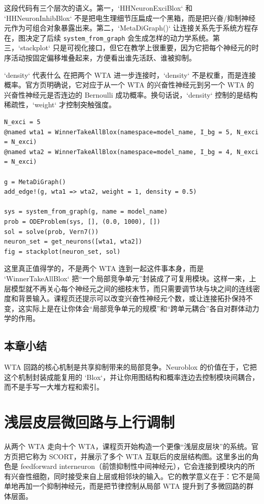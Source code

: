 \documentclass[a4paper]{article}
\begin{document}
这段代码有三个层次的语义。第一，`HHNeuronExciBlox` 和 `HHNeuronInhibBlox` 不是把电生理细节压扁成一个黑箱，而是把兴奋/抑制神经元作为可组合对象暴露出来。第二，`MetaDiGraph()` 让连接关系先于系统方程存在，图决定了后续 \texttt{system\_from\_graph} 会生成怎样的动力学系统。第三，`stackplot` 只是可视化接口，但它在教学上很重要，因为它把每个神经元的时序活动按固定偏移堆叠起来，方便看出谁先活跃、谁被抑制。

\begin{knowledgebox}{`density` 代表什么}
在把两个 WTA 进一步连接时，`density` 不是权重，而是连接概率。官方页明确说，它对应于从一个 WTA 的兴奋性神经元到另一个 WTA 的兴奋性神经元是否连边的 Bernoulli 成功概率。换句话说，`density` 控制的是结构稀疏性，`weight` 才控制突触强度。
\end{knowledgebox}

\begin{lstlisting}[caption={把 WTA 封装成复合块并连接两个 WTA},label={lst:wta_composite}]
N_exci = 5
@named wta1 = WinnerTakeAllBlox(namespace=model_name, I_bg = 5, N_exci = N_exci)
@named wta2 = WinnerTakeAllBlox(namespace=model_name, I_bg = 4, N_exci = N_exci)

g = MetaDiGraph()
add_edge!(g, wta1 => wta2, weight = 1, density = 0.5)

sys = system_from_graph(g, name = model_name)
prob = ODEProblem(sys, [], (0.0, 1000), [])
sol = solve(prob, Vern7())
neuron_set = get_neurons([wta1, wta2])
fig = stackplot(neuron_set, sol)
\end{lstlisting}

这里真正值得学的，不是两个 WTA 连到一起这件事本身，而是 `WinnerTakeAllBlox` 把“一个局部竞争单元”封装成了可复用模块。这样一来，上层模型就不再关心每个神经元之间的细枝末节，而只需要调节块与块之间的连线密度和背景输入。课程页还提示可以改变兴奋性神经元个数，或让连接拓扑保持不变，这实际上是在让你体会“局部竞争单元的规模”和“跨单元耦合”各自对群体动力学的作用。

\subsection{本章小结}
WTA 回路的核心机制是共享抑制带来的局部竞争。Neuroblox 的价值在于，它把这个机制封装成能复用的 `Blox`，并让你用图结构和概率连边去控制模块间耦合，而不是手写一大堆方程和索引。

\section{浅层皮层微回路与上行调制}
从两个 WTA 走向十个 WTA，课程页开始构造一个更像“浅层皮层块”的系统。官方页把它称为 SCORT，并展示了多个 WTA 互联后的皮层结构图。这里多出的角色是 feedforward interneuron（前馈抑制性中间神经元），它会连接到模块内的所有兴奋性细胞，同时接受来自上层或相邻块的输入。它的教学意义在于：它不是简单地再加一个抑制神经元，而是把节律控制从局部 WTA 提升到了多微回路的群体层面。
\end{document}
